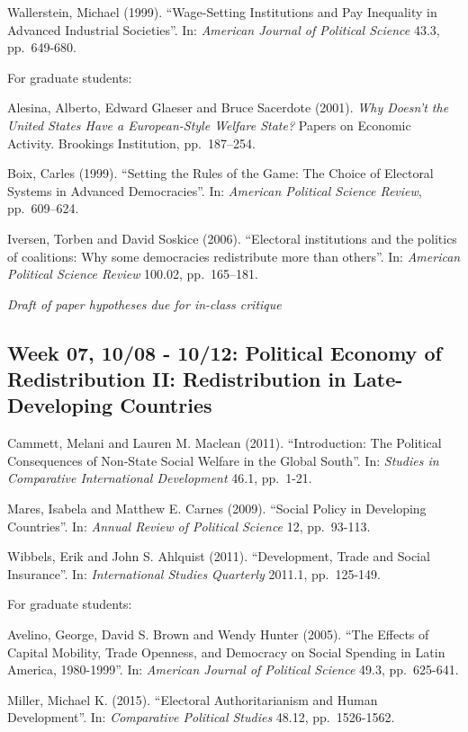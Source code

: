 \documentclass[11pt,]{article}
\begin{document}
Wallerstein, Michael (1999). ``Wage-Setting Institutions and Pay
Inequality in Advanced Industrial Societies''. In:
\emph{American Journal of Political Science} 43.3, pp.~649-680.

For graduate students:

Alesina, Alberto, Edward Glaeser and Bruce Sacerdote (2001).
\emph{Why Doesn't the United States Have a European-Style Welfare State?}
Papers on Economic Activity. Brookings Institution, pp.~187--254.

Boix, Carles (1999). ``Setting the Rules of the Game: The Choice of
Electoral Systems in Advanced Democracies''. In:
\emph{American Political Science Review}, pp.~609--624.

Iversen, Torben and David Soskice (2006). ``Electoral institutions and
the politics of coalitions: Why some democracies redistribute more than
others''. In: \emph{American Political Science Review} 100.02,
pp.~165--181.

\emph{Draft of paper hypotheses due for in-class critique}

\subsection{Week 07, 10/08 - 10/12: Political Economy of Redistribution
II: Redistribution in Late-Developing
Countries}\label{week-07-1008---1012-political-economy-of-redistribution-ii-redistribution-in-late-developing-countries}

Cammett, Melani and Lauren M. Maclean (2011). ``Introduction: The
Political Consequences of Non-State Social Welfare in the Global
South''. In: \emph{Studies in Comparative International Development}
46.1, pp.~1-21.

Mares, Isabela and Matthew E. Carnes (2009). ``Social Policy in
Developing Countries''. In: \emph{Annual Review of Political Science}
12, pp.~93-113.

Wibbels, Erik and John S. Ahlquist (2011). ``Development, Trade and
Social Insurance''. In: \emph{International Studies Quarterly} 2011.1,
pp.~125-149.

For graduate students:

Avelino, George, David S. Brown and Wendy Hunter (2005). ``The Effects
of Capital Mobility, Trade Openness, and Democracy on Social Spending in
Latin America, 1980-1999''. In:
\emph{American Journal of Political Science} 49.3, pp.~625-641.

Miller, Michael K. (2015). ``Electoral Authoritarianism and Human
Development''. In: \emph{Comparative Political Studies} 48.12,
pp.~1526-1562.
\end{document}
